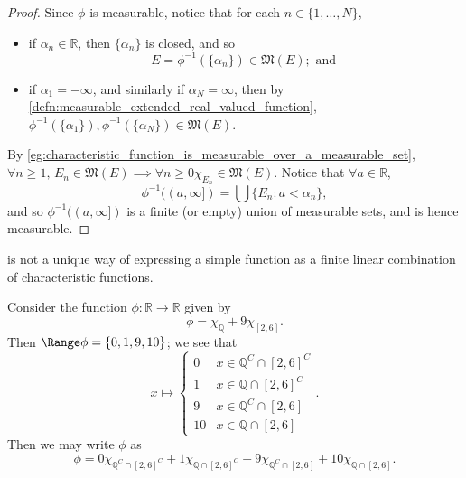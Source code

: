 \documentclass[notoc,notitlepage]{tufte-book}
\begin{document}
\begin{proof}
  \hlbnoted{$(\implies)$} Since $\phi$ is measurable, notice that for each $n
  \in \{1, \ldots, N\}$,
  \begin{itemize}
    \item if $\alpha_n \in \mathbb{R}$, then $\{ \alpha_n \}$ is closed, and so
      \begin{equation*}
        E = \phi^{-1}(\{\alpha_n\}) \in \mathfrak{M}(E); \text{ and }
      \end{equation*}
    \item if $\alpha_1 = -\infty$, and similarly if $\alpha_N = \infty$, then by
      \cref{defn:measurable_extended_real_valued_function},
      $\phi^{-1}(\{\alpha_1\}), \phi^{-1}(\{\alpha_N\}) \in \mathfrak{M}(E)$.
  \end{itemize}

  \noindent
  \hlbnoted{$(\impliedby)$} By
  \cref{eg:characteristic_function_is_measurable_over_a_measurable_set},
  $\forall n \geq 1,\, E_n \in \mathfrak{M}(E) \implies \forall n \geq 0
  \chi_{E_n} \in \mathfrak{M}(E)$. Notice that $\forall a \in \mathbb{R}$,
  \begin{equation*}
    \phi^{-1}((a, \infty]) = \bigcup \{ E_n : a < \alpha_n \},
  \end{equation*}
  and so $\phi^{-1}((a, \infty])$ is a finite (or empty) union of measurable
  sets, and is hence measurable.
\end{proof}

 is not a unique way of expressing a simple
function as a finite linear combination of characteristic functions.

\begin{eg}
  Consider the function $\phi : \mathbb{R} \to \mathbb{R}$ given by
  \begin{equation*}
    \phi = \chi_{\mathbb{Q}} + 9 \chi_{[2, 6]}.
  \end{equation*}
  Then $\Range \phi = \{ 0, 1, 9, 10 \}$; we see that
  \begin{equation*}
    x \mapsto \begin{cases}
      0  & x \in \mathbb{Q}^C \cap [2, 6]^C \\
      1  & x \in \mathbb{Q} \cap [2, 6]^C \\
      9  & x \in \mathbb{Q}^C \cap [2, 6] \\
      10 & x \in \mathbb{Q} \cap [2, 6]
    \end{cases}.
  \end{equation*}
  Then we may write $\phi$ as
  \begin{equation*}
    \phi = 0 \chi_{\mathbb{Q}^C \cap [2, 6]^C} + 1 \chi_{\mathbb{Q} \cap [2,
    6]^C} + 9 \chi_{\mathbb{Q}^C \cap [2, 6]} + 10 \chi_{\mathbb{Q} \cap [2,
    6]}.
  \end{equation*}
\end{eg}
\end{document}
